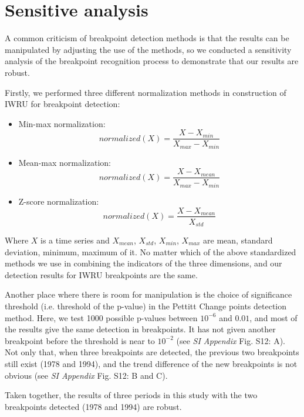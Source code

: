 \documentclass[9pt,twoside,lineno]{pnas-new}
\begin{document}
\newpage
\section*{Sensitive analysis}
A common criticism of breakpoint detection methods is that the results can be manipulated by adjusting the use of the methods, so we conducted a sensitivity analysis of the breakpoint recognition process to demonstrate that our results are robust. 

Firstly, we performed three different normalization methods in construction of IWRU for breakpoint detection:

\begin{itemize}
    \item Min-max normalization:
        $$ normalized(X) = \frac{X - X_{min}}{X_{max} - X_{min}} $$
    \item Mean-max normalization:
        $$ normalized(X) = \frac{X - X_{mean}}{X_{max} - X_{min}} $$
    \item Z-score normalization:
        $$ normalized(X) = \frac{X-X_{mean}}{X_{std}} $$ 
\end{itemize}

Where $X$ is a time series and $X_{mean}$, $X_{std}$, $X_{min}$, $X_{max}$ are mean, standard deviation, minimum, maximum of it.
No matter which of the above standardized methods we use in combining the indicators of the three dimensions, and our detection results for IWRU breakpoints are the same.

Another place where there is room for manipulation is the choice of significance threshold (i.e. threshold of the p-value) in the Pettitt Change points detection method. Here, we test 1000 possible p-values between $10^{-6}$ and $0.01$, and most of the results give the same detection in breakpoints. 
It has not given another breakpoint before the threshold is near to $10^{-2}$ (see \textit{SI Appendix} Fig. S12: A). 
Not only that, when three breakpoints are detected, the previous two breakpoints still exist (1978 and 1994), and the trend difference of the new breakpoints is not obvious (see \textit{SI Appendix} Fig. S12: B and C).

Taken together, the results of three periods in this study with the two breakpoints detected (1978 and 1994) are robust.
\end{document}
